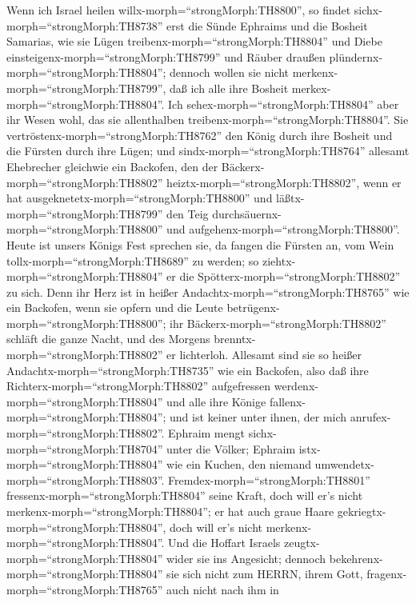  Wenn ich Israel heilen willx-morph=``strongMorph:TH8800'',
so findet sichx-morph=``strongMorph:TH8738'' erst die Sünde Ephraims und
die Bosheit Samarias, wie sie Lügen
treibenx-morph=``strongMorph:TH8804'' und Diebe
einsteigenx-morph=``strongMorph:TH8799'' und Räuber draußen
plündernx-morph=``strongMorph:TH8804'';  dennoch wollen sie
nicht merkenx-morph=``strongMorph:TH8799'', daß ich alle ihre Bosheit
merkex-morph=``strongMorph:TH8804''. Ich
sehex-morph=``strongMorph:TH8804'' aber ihr Wesen wohl, das sie
allenthalben treibenx-morph=``strongMorph:TH8804''.  Sie
vertröstenx-morph=``strongMorph:TH8762'' den König durch ihre Bosheit
und die Fürsten durch ihre Lügen;  und
sindx-morph=``strongMorph:TH8764'' allesamt Ehebrecher gleichwie ein
Backofen, den der Bäckerx-morph=``strongMorph:TH8802''
heiztx-morph=``strongMorph:TH8802'', wenn er hat
ausgeknetetx-morph=``strongMorph:TH8800'' und
läßtx-morph=``strongMorph:TH8799'' den Teig
durchsäuernx-morph=``strongMorph:TH8800'' und
aufgehenx-morph=``strongMorph:TH8800''.  Heute ist unsers
Königs Fest sprechen sie, da fangen die Fürsten an, vom Wein
tollx-morph=``strongMorph:TH8689'' zu werden; so
ziehtx-morph=``strongMorph:TH8804'' er die
Spötterx-morph=``strongMorph:TH8802'' zu sich.  Denn ihr
Herz ist in heißer Andachtx-morph=``strongMorph:TH8765'' wie ein
Backofen, wenn sie opfern und die Leute
betrügenx-morph=``strongMorph:TH8800''; ihr
Bäckerx-morph=``strongMorph:TH8802'' schläft die ganze Nacht, und des
Morgens brenntx-morph=``strongMorph:TH8802'' er lichterloh. 
Allesamt sind sie so heißer Andachtx-morph=``strongMorph:TH8735'' wie
ein Backofen, also daß ihre Richterx-morph=``strongMorph:TH8802''
aufgefressen werdenx-morph=``strongMorph:TH8804'' und alle ihre Könige
fallenx-morph=``strongMorph:TH8804''; und ist keiner unter ihnen, der
mich anrufex-morph=``strongMorph:TH8802''.  Ephraim mengt
sichx-morph=``strongMorph:TH8704'' unter die Völker; Ephraim
istx-morph=``strongMorph:TH8804'' wie ein Kuchen, den niemand
umwendetx-morph=``strongMorph:TH8803''. 
Fremdex-morph=``strongMorph:TH8801''
fressenx-morph=``strongMorph:TH8804'' seine Kraft, doch will er's nicht
merkenx-morph=``strongMorph:TH8804''; er hat auch graue Haare
gekriegtx-morph=``strongMorph:TH8804'', doch will er's nicht
merkenx-morph=``strongMorph:TH8804''.  Und die Hoffart
Israels zeugtx-morph=``strongMorph:TH8804'' wider sie ins Angesicht;
dennoch bekehrenx-morph=``strongMorph:TH8804'' sie sich nicht zum HERRN,
ihrem Gott, fragenx-morph=``strongMorph:TH8765'' auch nicht nach ihm in
